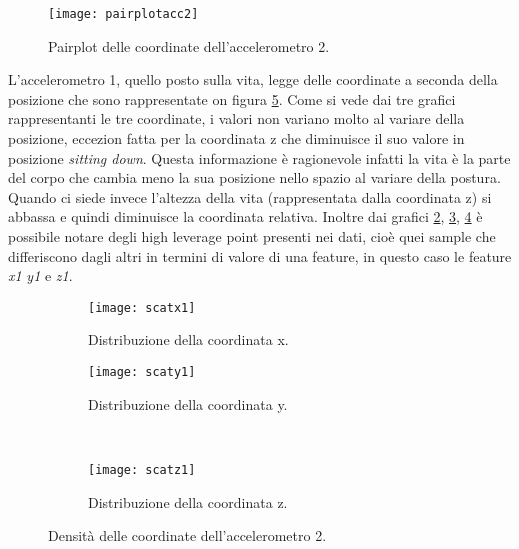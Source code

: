 \begin{figure}[h]
    \centering\texttt{[image: pairplotacc2]}
    \caption{Pairplot delle coordinate dell'accelerometro 2.}
    \label{fig:pairplot}
\end{figure}

L'accelerometro 1, quello posto sulla vita, legge delle coordinate a seconda della posizione che sono rappresentate on figura \ref{fig:scatterplot}. Come si vede dai tre grafici rappresentanti le tre coordinate, i valori non variano molto al variare della posizione, eccezion fatta per la coordinata z che diminuisce il suo valore in posizione \textit{sitting down}. Questa informazione è ragionevole infatti la vita è la parte del corpo che cambia meno la sua posizione nello spazio al variare della postura.  Quando ci siede invece l'altezza della vita (rappresentata dalla coordinata z) si abbassa e quindi diminuisce la coordinata relativa. Inoltre dai grafici \ref{fig:scatterplot:x1}, \ref{fig:scatterplot:y1}, \ref{fig:scatterplot:z1} è possibile notare degli high leverage point presenti nei dati, cioè quei sample che differiscono dagli altri in termini di valore di una feature, in questo caso le feature \textit{x1} \textit{y1} e \textit{z1}.

\begin{figure}[h]
    \centering
    \begin{subfigure}[t]{0.4\textwidth}
        \centering\texttt{[image: scatx1]}
        \caption{Distribuzione della coordinata x.}
        \label{fig:scatterplot:x1}
    \end{subfigure}
    \begin{subfigure}[t]{0.4\textwidth}
        \centering\texttt{[image: scaty1]}
        \caption{Distribuzione della coordinata y.}
        \label{fig:scatterplot:y1}
    \end{subfigure}
    \\
    \begin{subfigure}[t]{0.4\textwidth}
        \centering\texttt{[image: scatz1]}
        \caption{Distribuzione della coordinata z.}
        \label{fig:scatterplot:z1}
    \end{subfigure}
    \caption{Densità delle coordinate dell'accelerometro 2.}
    \label{fig:scatterplot}
\end{figure}


